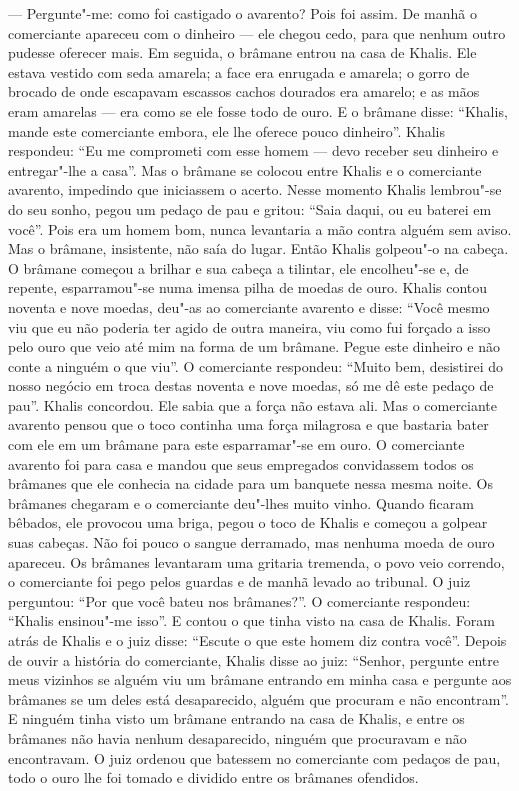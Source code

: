 --- Pergunte"-me: como foi castigado o avarento? Pois foi assim. De manhã
o comerciante apareceu com o dinheiro --- ele chegou cedo, para que
nenhum outro pudesse oferecer mais. Em seguida, o brâmane entrou na casa
de Khalis. Ele estava vestido com seda amarela; a face era enrugada e
amarela; o gorro de brocado de onde escapavam escassos cachos dourados
era amarelo; e as mãos eram amarelas --- era como se ele fosse todo de
ouro. E o brâmane disse: ``Khalis, mande este comerciante embora, ele
lhe oferece pouco dinheiro''. Khalis respondeu: ``Eu me comprometi com
esse homem --- devo receber seu dinheiro e entregar"-lhe a casa''. Mas o
brâmane se colocou entre Khalis e o comerciante avarento, impedindo que
iniciassem o acerto. Nesse momento Khalis lembrou"-se do seu sonho, pegou
um pedaço de pau e gritou: ``Saia daqui, ou eu baterei em você''. Pois
era um homem bom, nunca levantaria a mão contra alguém sem aviso. Mas o
brâmane, insistente, não saía do lugar. Então Khalis golpeou"-o na
cabeça. O brâmane começou a brilhar e sua cabeça a tilintar, ele
encolheu"-se e, de repente, esparramou"-se numa imensa pilha de moedas de
ouro. Khalis contou noventa e nove moedas, deu"-as ao comerciante
avarento e disse: ``Você mesmo viu que eu não poderia ter agido de outra
maneira, viu como fui forçado a isso pelo ouro que veio até mim na forma
de um brâmane. Pegue este dinheiro e não conte a ninguém o que viu''. O
comerciante respondeu: ``Muito bem, desistirei do nosso negócio em troca
destas noventa e nove moedas, só me dê este pedaço de pau''. Khalis
concordou. Ele sabia que a força não estava ali. Mas o comerciante
avarento pensou que o toco continha uma força milagrosa e que bastaria
bater com ele em um brâmane para este esparramar"-se em ouro. O
comerciante avarento foi para casa e mandou que seus empregados
convidassem todos os brâmanes que ele conhecia na cidade para um
banquete nessa mesma noite. Os brâmanes chegaram e o comerciante
deu"-lhes muito vinho. Quando ficaram bêbados, ele provocou uma briga,
pegou o toco de Khalis e começou a golpear suas cabeças. Não foi pouco o
sangue derramado, mas nenhuma moeda de ouro apareceu. Os brâmanes
levantaram uma gritaria tremenda, o povo veio correndo, o comerciante
foi pego pelos guardas e de manhã levado ao tribunal. O juiz perguntou:
``Por que você bateu nos brâmanes?''. O comerciante respondeu: ``Khalis
ensinou"-me isso''. E contou o que tinha visto na casa de Khalis. Foram
atrás de Khalis e o juiz disse: ``Escute o que este homem diz contra
você''. Depois de ouvir a história do comerciante, Khalis disse ao juiz:
``Senhor, pergunte entre meus vizinhos se alguém viu um brâmane entrando
em minha casa e pergunte aos brâmanes se um deles está desaparecido,
alguém que procuram e não encontram''. E ninguém tinha visto um brâmane
entrando na casa de Khalis, e entre os brâmanes não havia nenhum
desaparecido, ninguém que procuravam e não encontravam. O juiz ordenou
que batessem no comerciante com pedaços de pau, todo o ouro lhe foi
tomado e dividido entre os brâmanes ofendidos.

